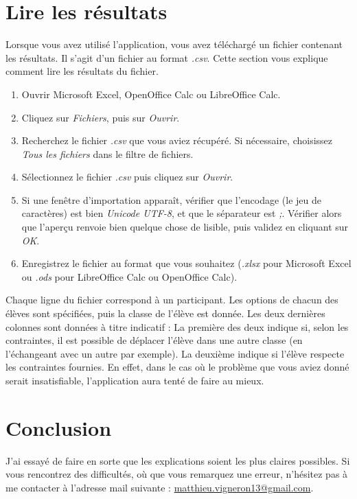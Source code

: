 \documentclass[11pt,a4paper]{article}
\begin{document}
\section{Lire les résultats}
\label{sec:resultats}
Lorsque vous avez utilisé l'application, vous avez téléchargé un fichier contenant les résultats. Il s'agit d'un fichier au format \textit{.csv}. Cette section vous explique comment lire les résultats du fichier.
\begin{enumerate}
  \item Ouvrir Microsoft Excel, OpenOffice Calc ou LibreOffice Calc.
  \item Cliquez sur \textit{Fichiers}, puis sur \textit{Ouvrir}.
  \item Recherchez le fichier \textit{.csv} que vous aviez récupéré. Si nécessaire, choisissez \textit{Tous les fichiers} dans le filtre de fichiers.
  \item Sélectionnez le fichier \textit{.csv} puis cliquez sur \textit{Ouvrir}.
  \item Si une fenêtre d'importation apparaît, vérifier que l'encodage (le jeu de caractères) est bien \textit{Unicode UTF-8}, et que le séparateur est \textit{;}. Vérifier alors que l'aperçu renvoie bien quelque chose de lisible, puis validez en cliquant sur \textit{OK}.
  \item Enregistrez le fichier au format que vous souhaitez (\textit{.xlsx} pour Microsoft Excel ou \textit{.ods} pour LibreOffice Calc ou OpenOffice Calc).
\end{enumerate}
Chaque ligne du fichier correspond à un participant. Les options de chacun des élèves sont spécifiées, puis la classe de l'élève est donnée. Les deux dernières colonnes sont données à titre indicatif : La première des deux indique si, selon les contraintes, il est possible de déplacer l'élève dans une autre classe (en l'échangeant avec un autre par exemple). La deuxième indique si l'élève respecte les contraintes fournies. En effet, dans le cas où le problème que vous aviez donné serait insatisfiable, l'application aura tenté de faire au mieux.

\section{Conclusion}
\label{sec:conclusion}
J'ai essayé de faire en sorte que les explications soient les plus claires possibles. Si vous rencontrez des difficultés, où que vous remarquez une erreur, n'hésitez pas à me contacter à l'adresse mail suivante : \href{mailto:matthieu.vigneron13@gmail.com}{matthieu.vigneron13@gmail.com}.
\end{document}
